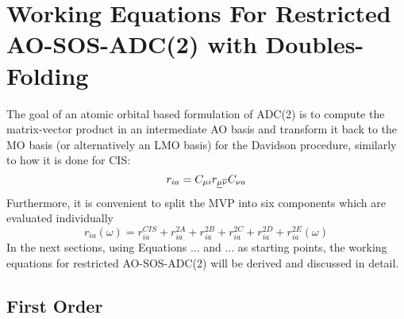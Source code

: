 \section{Working Equations For Restricted AO-SOS-ADC(2) with Doubles-Folding}

The goal of an atomic orbital based formulation of ADC(2) is to compute the matrix-vector product in an intermediate AO basis and transform it back to the MO basis (or alternatively an LMO basis) for the Davidson procedure, similarly to how it is done for CIS:
\begin{equation}
r_{ia} = C_{\mu i} r_{\underline{\mu} \overline{\nu}} C_{\nu a}
\end{equation}
\noindent Furthermore, it is convenient to split the MVP into six components which are evaluated individually
\begin{equation}
r_{ia}(\omega) = r_{ia}^{CIS} + r_{ia}^{2A} + r_{ia}^{2B} + r_{ia}^{2C} + r_{ia}^{2D} + r_{ia}^{2E}(\omega)
\end{equation}
\noindent In the next sections, using Equations ... and ... as starting points, the working equations for restricted AO-SOS-ADC(2) will be derived and discussed in detail. 

\subsection{First Order}

